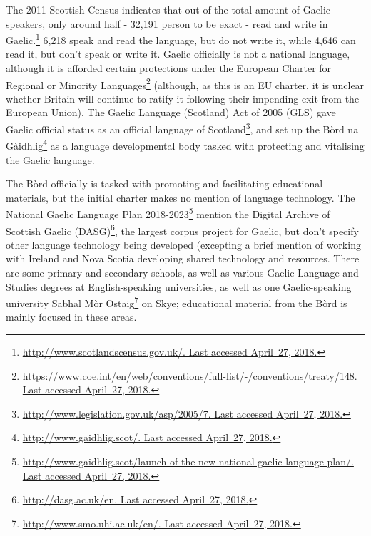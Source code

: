The 2011 Scottish Census indicates that out of the total amount of Gaelic speakers, only around half - 32,191 person to be exact - read and write in Gaelic.\footnote{\href{http://www.scotlandscensus.gov.uk/}{http://www.scotlandscensus.gov.uk/. Last accessed April~27, 2018.}} 6,218 speak and read the language, but do not write it, while 4,646 can read it, but don't speak or write it. Gaelic officially is not a national language, although it is afforded certain protections under the European Charter for Regional or Minority Languages\footnote{\href{https://www.coe.int/en/web/conventions/full-list/-/conventions/treaty/148}{https://www.coe.int/en/web/conventions/full-list/-/conventions/treaty/148. Last accessed April~27, 2018.}} (although, as this is an EU charter, it is unclear whether Britain will continue to ratify it following their impending exit from the European Union). The Gaelic Language (Scotland) Act of 2005 (GLS) gave Gaelic official status as an official language of Scotland\footnote{\href{http://www.legislation.gov.uk/asp/2005/7}{http://www.legislation.gov.uk/asp/2005/7. Last accessed April~27, 2018.}}, and set up the B\`ord na G\`aidhlig\footnote{\href{http://www.gaidhlig.scot/}{http://www.gaidhlig.scot/. Last accessed April~27, 2018.}} as a language developmental body tasked with protecting and vitalising the Gaelic language.

The B\`ord officially is tasked with promoting and facilitating educational materials, but the initial charter makes no mention of language technology. The National Gaelic Language Plan 2018-2023\footnote{\href{http://www.gaidhlig.scot/launch-of-the-new-national-gaelic-language-plan/}{http://www.gaidhlig.scot/launch-of-the-new-national-gaelic-language-plan/. Last accessed April~27, 2018.}} \citep{bord2018national} mention the Digital Archive of Scottish Gaelic (DASG)\footnote{\href{http://dasg.ac.uk/en}{http://dasg.ac.uk/en. Last accessed April~27, 2018.}}, the largest corpus project for Gaelic, but don't specify other language technology being developed (excepting a brief mention of working with Ireland and Nova Scotia developing shared technology and resources. There are some primary and secondary schools, as well as various Gaelic Language and Studies degrees at English-speaking universities, as well as one Gaelic-speaking university Sabhal M\`or Ostaig\footnote{\href{http://www.smo.uhi.ac.uk/en/}{http://www.smo.uhi.ac.uk/en/. Last accessed April~27, 2018.}} on Skye; educational material from the B\`ord is mainly focused in these areas. 

